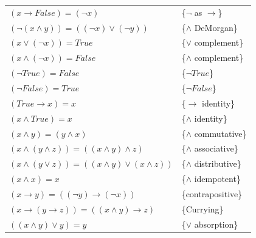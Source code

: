 \begin{figure}
\begin{center}
\begin{tabular}{ll}
$(x \rightarrow False) = (\neg x)$                                   & \{$\neg$ as $\rightarrow$\}\label{neg-as-imp} \\
$(\neg(x \wedge y)) = ((\neg x) \vee (\neg y))$                      & \{$\wedge$ DeMorgan\}      \label{and-DeMorgan} \\
$(x \vee (\neg x)) = True$                                           & \{$\vee$ complement\}      \label{or-complement} \\
$(x \wedge (\neg x)) = False$                                        & \{$\wedge$ complement\}    \label{and-complement} \\
$(\neg True) = False$                                                & \{$\neg True$\}            \label{not-True} \\
$(\neg False) = True$                                                & \{$\neg False$\}           \label{not-False} \\
$(True \rightarrow x) = x$                                           & \{$\rightarrow$ identity\} \label{imp-identity} \\
$(x \wedge True) = x$                                                & \{$\wedge$ identity\}      \label{and-identity} \\
$(x \wedge y) = (y \wedge x)$                                        & \{$\wedge$ commutative\}   \label{and-commutative} \\
$(x \wedge (y \wedge z)) = ((x \wedge y) \wedge z)$                  & \{$\wedge$ associative\}   \label{and-associative} \\
$(x \wedge (y \vee z)) = ((x \wedge y) \vee (x \wedge z))$           & \{$\wedge$ distributive\}  \label{and-distributive} \\
$(x \wedge x) = x$                                                   & \{$\wedge$ idempotent\}    \label{and-idempotent} \\
$(x \rightarrow y) = ((\neg y) \rightarrow (\neg x))$                & \{contrapositive\}         \label{contrapositive} \\
$(x \rightarrow (y \rightarrow z)) = ((x \wedge y) \rightarrow z)$   & \{Currying\}               \label{currying} \\
$((x \wedge y) \vee y) = y$                                          & \{$\vee$ absorption\}      \label{or-absorption} \\

\end{tabular}
\end{center}
\end{figure}
